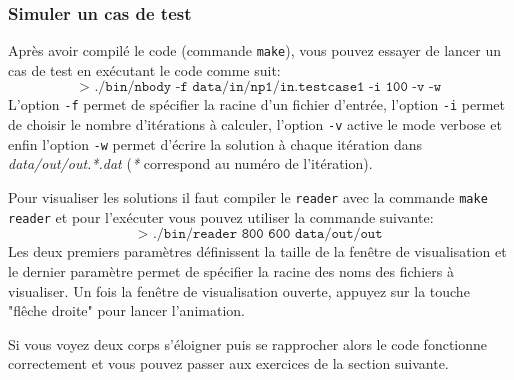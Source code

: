 \subsubsection{Simuler un cas de test}
Après avoir compilé le code (commande \texttt{make}), vous pouvez essayer de lancer un cas de test en exécutant le code comme suit:
\begin{equation*}
	\texttt{> ./bin/nbody -f data/in/np1/in.testcase1 -i 100 -v -w}
\end{equation*}
L'option \texttt{-f} permet de spécifier la racine d'un fichier d'entrée, l'option \texttt{-i} permet de choisir le nombre d'itérations à calculer, l'option \texttt{-v} active le mode verbose et enfin l'option \texttt{-w} permet d'écrire la solution à chaque itération dans \textit{data/out/out.*.dat} (\textit{*} correspond au numéro de l'itération).

Pour visualiser les solutions il faut compiler le \texttt{reader} avec la commande \texttt{make reader} et pour l'exécuter vous pouvez utiliser la commande suivante:
\begin{equation*}
	\texttt{> ./bin/reader 800 600 data/out/out}
\end{equation*}
Les deux premiers paramètres définissent la taille de la fenêtre de visualisation et le dernier paramètre permet de spécifier la racine des noms des fichiers à visualiser.
Un fois la fenêtre de visualisation ouverte, appuyez sur la touche "flêche droite" pour lancer l'animation.

Si vous voyez deux corps s'éloigner puis se rapprocher alors le code fonctionne correctement et vous pouvez passer aux exercices de la section suivante.
